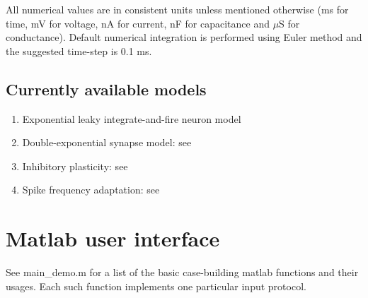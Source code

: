 \documentclass{article}
\begin{document}
All numerical values are in consistent units unless mentioned otherwise (ms for time, mV for voltage, nA for current, nF for capacitance and ${\mu}$S for conductance). 
Default numerical integration is performed using Euler method and the suggested time-step is 0.1 ms\cite{litwin2012slow}.

\subsection{Currently available models}
\begin{enumerate}
\item Exponential leaky integrate-and-fire neuron model
\item Double-exponential synapse model: see \cite{keane2015propagating}
\item Inhibitory plasticity: see \cite{vogels2011inhibitory}
\item Spike frequency adaptation: see \cite{madison1984control}

\end{enumerate}

%	





\section{Matlab user interface}
\label{sec:matlab user interface}
See main\_demo.m for a list of the basic case-building matlab functions and their usages. Each such function implements one particular input protocol. 

\end{document}

